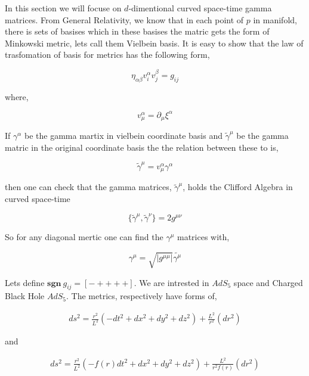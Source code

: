 In this section we will focuse on $d$-dimentional curved space-time gamma matrices. From General Relativity, we know that in each point of $p$ in manifold, there is sets of basises which in these basises the matric gets the form of Minkowski metric, lets call them Vielbein basis. It is easy to show that the law of trasfomation of basis for metrics has the following form,

\begin{equation}
   \eta_{\alpha\beta} v^{\alpha}_i v^{\beta}_j = g_{ij}
\end{equation}

where,

\begin{equation}
   v^{\alpha}_{\mu} = \partial_{\mu} \xi^{\alpha}
\end{equation}

If $\gamma^{\alpha}$ be the gamma martix in vielbein coordinate basis and $\tilde{\gamma}^{\mu}$ be the gamma matric in the original coordinate basis the the relation between these to is,

\begin{equation}
   \tilde{\gamma}^{\mu} = v^{\alpha}_{\mu} \gamma^{\alpha}
\end{equation}

then one can check that the gamma matrices, $\tilde{\gamma}^{\mu}$, holds the Clifford Algebra in curved space-time

\begin{equation}
   \{\tilde{\gamma}^{\mu},\tilde{\gamma}^{\nu}\} = 2g^{\mu\nu}
\end{equation}

So for any diagonal mertic one can find the $\gamma^{\mu}$ matrices with,

\begin{equation}
   \gamma^{\mu} = \sqrt{|g^{\mu\mu}|}\tilde{\gamma^{\mu}}
\end{equation}

Lets define $\mathbf{sgn}~g_{ij}=[- + + + +]$. We are intrested in $AdS_5$ space and Charged Black Hole $AdS_5$. The metrics, respectively have forms of,

\begin{align}
   ds^2 = \frac{r^2}{L^2}(-dt^2 + dx^2 + dy^2 + dz^2) + \frac{L^2}{r^2}(dr^2)
\end{align}

and 

\begin{align}
   ds^2 = \frac{r^2}{L^2}(-f(r)dt^2 + dx^2 + dy^2 + dz^2) + \frac{L^2}{r^2f(r)}(dr^2)
\end{align}

